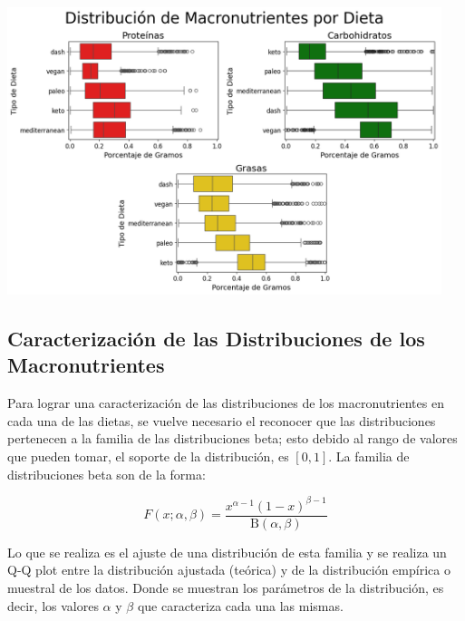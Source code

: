 \documentclass[12pt,a4paper]{article}
\begin{document}
            \begin{center}
                \includegraphics[width=0.95\textwidth]{Resources/2_03_plot_06.png}
            \end{center}
    
    \subsection{Caracterización de las Distribuciones de los Macronutrientes}
        Para lograr una caracterización de las distribuciones de los macronutrientes 
        en cada una de las dietas, se vuelve necesario el reconocer que las distribuciones 
        pertenecen a la familia de las distribuciones beta; esto debido al rango de valores 
        que pueden tomar, el soporte de la distribución, es $[0,1]$. La familia de distribuciones 
        beta son de la forma\cite{beta_distribution}:

        $$F(x;\alpha,\beta) = \frac {x^{\alpha -1}(1-x)^{\beta -1}}{\mathrm {B} (\alpha ,\beta )}$$ 

        Lo que se realiza es el ajuste de una distribución de esta familia y se realiza 
        un Q-Q plot entre la distribución ajustada (teórica) y de la distribución empírica 
        o muestral de los datos. Donde se muestran los parámetros de la distribución, es 
        decir, los valores $\alpha$ y $\beta$ que caracteriza cada una las mismas.\\
\end{document}
